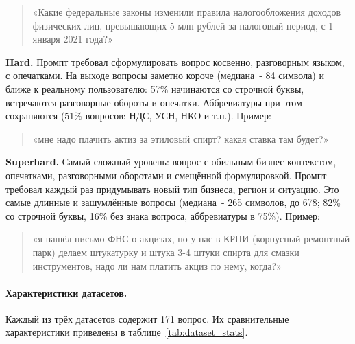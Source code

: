 \documentclass[a4paper,12pt]{article}
\begin{document}
\begin{quote}
«Какие федеральные законы изменили правила налогообложения доходов физических лиц, превышающих 5 млн рублей за налоговый период, с 1 января 2021 года?»
\end{quote}

\textbf{Hard.} Промпт требовал сформулировать вопрос косвенно, разговорным языком, с опечатками. На выходе вопросы заметно короче (медиана~- 84 символа) и ближе к реальному пользователю: 57\% начинаются со строчной буквы, встречаются разговорные обороты и опечатки. Аббревиатуры при этом сохраняются (51\% вопросов: НДС, УСН, НКО и т.п.). Пример:

\begin{quote}
«мне надо плачить актиз за этиловый спирт? какая ставка там будет?»
\end{quote}

\textbf{Superhard.} Самый сложный уровень: вопрос с обильным бизнес-контекстом, опечатками, разговорными оборотами и смещённой формулировкой. Промпт требовал каждый раз придумывать новый тип бизнеса, регион и ситуацию. Это самые длинные и зашумлённые вопросы (медиана~- 265 символов, до 678; 82\% со строчной буквы, 16\% без знака вопроса, аббревиатуры в 75\%). Пример:

\begin{quote}
«я нашёл письмо ФНС о акцизах, но у нас в КРПИ (корпусный ремонтный парк) делаем штукатурку и штука 3-4 штуки спирта для смазки инструментов, надо ли нам платить акциз по нему, когда?»
\end{quote}

\paragraph{Характеристики датасетов.}

Каждый из трёх датасетов содержит 171 вопрос. Их сравнительные характеристики приведены в таблице~\ref{tab:dataset_stats}.
\end{document}
